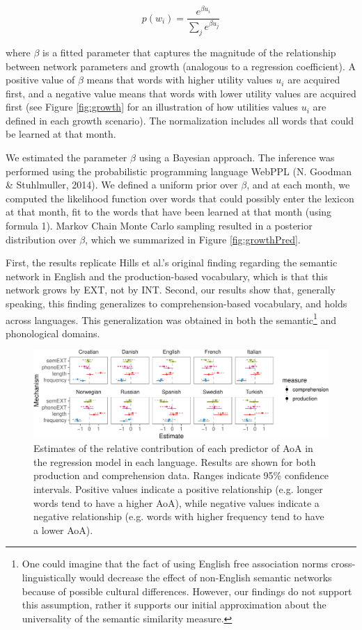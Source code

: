 \documentclass[english,floatsintext,man]{apa6}
\theoremstyle{definition}
\theoremstyle{definition}
\theoremstyle{definition}
\theoremstyle{remark}
\begin{document}
\begin{equation}
 p(w_i)= \frac{e^{\beta u_i}}{\sum_j e^{\beta u_j} }
\end{equation}

\noindent where \(\beta\) is a fitted parameter that captures the
magnitude of the relationship between network parameters and growth
(analogous to a regression coefficient). A positive value of \(\beta\)
means that words with higher utility values \(u_i\) are acquired first,
and a negative value means that words with lower utility values are
acquired first (see Figure \ref{fig:growth} for an illustration of how
utilities values \(u_i\) are defined in each growth scenario). The
normalization includes all words that could be learned at that month.

We estimated the parameter \(\beta\) using a Bayesian approach. The
inference was performed using the probabilistic programming language
WebPPL (N. Goodman \& Stuhlmuller, 2014). We defined a uniform prior
over \(\beta\), and at each month, we computed the likelihood function
over words that could possibly enter the lexicon at that month, fit to
the words that have been learned at that month (using formula 1). Markov
Chain Monte Carlo sampling resulted in a posterior distribution over
\(\beta\), which we summarized in Figure \ref{fig:growthPred}.

First, the results replicate Hills et al.'s original finding regarding
the semantic network in English and the production-based vocabulary,
which is that this network grows by EXT, not by INT. Second, our results
show that, generally speaking, this finding generalizes to
comprehension-based vocabulary, and holds across languages. This
generalization was obtained in both the
semantic\footnote{One could imagine that the fact of using English free association norms cross-linguistically would decrease the effect of non-English semantic networks because of possible cultural differences. However, our findings do not support this assumption, rather it supports our initial approximation about the universality of the semantic similarity measure.}
and phonological domains.

\begin{figure}[!h]
\includegraphics[width=\textwidth]{ms_files/figure-latex/staticPred-1} \caption{Estimates of the relative contribution of each predictor of AoA in the regression model in each language. Results are shown for both production and comprehension data. Ranges indicate 95\% confidence intervals. Positive values indicate a positive relationship (e.g. longer words tend to have a higher AoA), while negative values indicate a negative relationship (e.g. words with higher frequency tend to have a lower AoA).}\label{fig:staticPred}
\end{figure}
\end{document}
